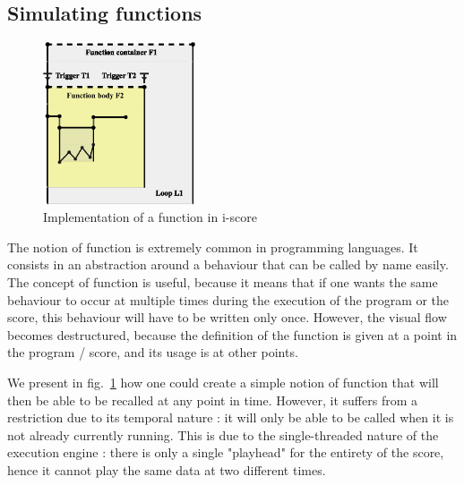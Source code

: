 \documentclass{article}
\begin{document}
\subsection{Simulating functions}

\begin{figure}
\centering
\includegraphics[width=0.40\textwidth]{images/function.eps}
\caption{Implementation of a function in i-score}
\label{fig.function}
\end{figure}

The notion of function is extremely common in programming languages.
It consists in an abstraction around a behaviour that can be called 
by name easily.
The concept of function is useful, because it means that 
if one wants the same behaviour to occur at multiple times during
the execution of the program or the score, this behaviour will 
have to be written only once.
However, the visual flow becomes destructured, because 
the definition of the function is given at a point in the program / score, 
and its usage is at other points.

We present in fig.~\ref{fig.function} how one could create a simple 
notion of function that will then be able to be recalled at any point in time.
However, it suffers from a restriction due to its temporal nature : 
it will only be able to be called when it is not already currently running. 
This is due to the single-threaded nature of the execution engine : there is 
only a single "playhead" for the entirety of the score, hence it cannot play the 
same data at two different times.
\end{document}
